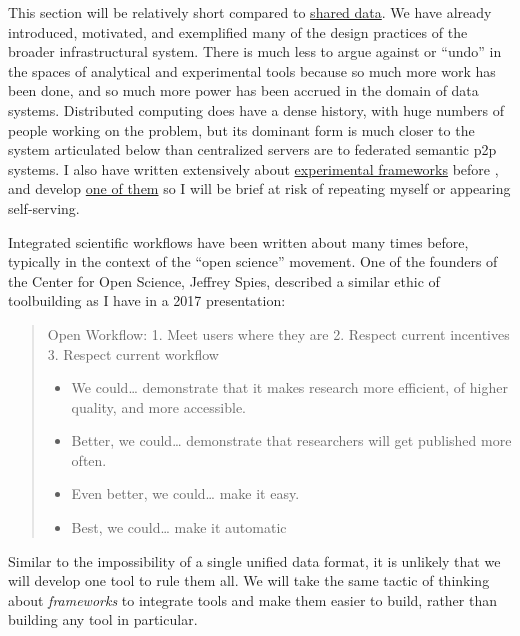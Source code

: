This section will be relatively short compared to
\protect\hyperlink{shared-data}{shared data}. We have already
introduced, motivated, and exemplified many of the design practices of
the broader infrastructural system. There is much less to argue against
or ``undo'' in the spaces of analytical and experimental tools because
so much more work has been done, and so much more power has been accrued
in the domain of data systems. Distributed computing does have a dense
history, with huge numbers of people working on the problem, but its
dominant form is much closer to the system articulated below than
centralized servers are to federated semantic p2p systems. I also have
written extensively about
\protect\hyperlink{experimental-frameworks}{experimental frameworks}
before \citep{saundersAutopilotAutomatingBehavioral2019} , and
develop \href{https://docs.auto-pi-lot.com/en/latest/}{one of them} so I
will be brief at risk of repeating myself or appearing self-serving.

Integrated scientific workflows have been written about many times
before, typically in the context of the ``open science'' movement. One
of the founders of the Center for Open Science, Jeffrey Spies, described
a similar ethic of toolbuilding as I have in a 2017 presentation:

\begin{quote}
Open Workflow: 1. Meet users where they are 2. Respect current
incentives 3. Respect current workflow

\begin{itemize}

\item
  We could\ldots{} demonstrate that it makes research more efficient, of
  higher quality, and more accessible.
\item
  Better, we could\ldots{} demonstrate that researchers will get
  published more often.
\item
  Even better, we could\ldots{} make it easy.
\item
  Best, we could\ldots{} make it automatic \citep{spiesWorkflowCentricApproachIncreasing2017} 
\end{itemize}
\end{quote}

Similar to the impossibility of a single unified data format, it is
unlikely that we will develop one tool to rule them all. We will take
the same tactic of thinking about \emph{frameworks} to integrate tools
and make them easier to build, rather than building any tool in
particular.

